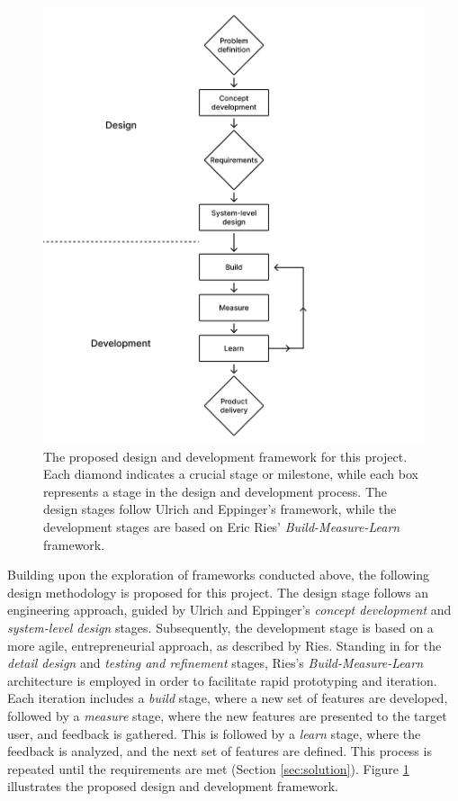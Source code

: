 \begin{figure}[htb!]
  \centering
  \includegraphics[width=\textwidth]{Pictures/Figures/design_framework.png}
  \caption{The proposed design and development framework for this project. Each diamond indicates a crucial stage or milestone, while each box represents a stage in the design and development process. The design stages follow Ulrich and Eppinger's framework, while the development stages are based on Eric Ries' \textit{Build-Measure-Learn} framework.}
  \label{fig:dnd-framework}
\end{figure}

Building upon the exploration of frameworks conducted above, the following design methodology is proposed for this project. The design stage follows an engineering approach, guided by Ulrich and Eppinger's \textit{concept development} and \textit{system-level design} stages. Subsequently, the development stage is based on a more agile, entrepreneurial approach, as described by Ries. Standing in for the \textit{detail design} and \textit{testing and refinement} stages, Ries's \textit{Build-Measure-Learn} architecture is employed in order to facilitate rapid prototyping and iteration. Each iteration includes a \textit{build} stage, where a new set of features are developed, followed by a \textit{measure} stage, where the new features are presented to the target user, and feedback is gathered. This is followed by a \textit{learn} stage, where the feedback is analyzed, and the next set of features are defined. This process is repeated until the requirements are met (Section \ref{sec:solution}). Figure \ref{fig:dnd-framework} illustrates the proposed design and development framework.


